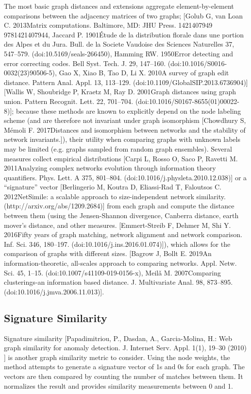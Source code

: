 The most basic graph distances and extensions aggregate element-by-element comparisons between the adjacency matrices of two graphs; [Golub G, van Loan C. 2013Matrix computations. Baltimore, MD: JHU Press. 1421407949 9781421407944,  Jaccard P. 1901Étude de la distribution florale dans une portion des Alpes et du Jura. Bull. de la Societe Vaudoise des Sciences Naturelles 37, 547–579. (doi:10.5169/seals-266450),  Hamming RW. 1950Error detecting and error correcting codes. Bell Syst. Tech. J. 29, 147–160. (doi:10.1016/S0016-0032(23)90506-5),  Gao X, Xiao B, Tao D, Li X. 2010A survey of graph edit distance. Pattern Anal. Appl. 13, 113–129. (doi:10.1109/GlobalSIP.2013.6736904)][Wallis W, Shoubridge P, Kraetz M, Ray D. 2001Graph distances using graph union. Pattern Recognit. Lett. 22, 701–704. (doi:10.1016/S0167-8655(01)00022-8)]; because these methods are known to explicitly depend on the node labeling scheme (and are therefore not invariant under graph isomorphism [Chowdhury S, Mémoli F. 2017Distances and isomorphism between networks and the stability of network invariants.]), their utility when comparing graphs with unknown labels  may be limited (e.g. graphs sampled from random graph ensembles). Several measures collect empirical distributions [Carpi L, Rosso O, Saco P, Ravetti M. 2011Analyzing complex networks evolution through information theory quantifiers. Phys. Lett. A 375, 801–804. (doi:10.1016/j.physleta.2010.12.038)] or a “signature” vector [Berlingerio M, Koutra D, Eliassi-Rad T, Faloutsos C. 2012NetSimile: a scalable approach to size-independent network similarity. (http://arxiv.org/abs/1209.2684)] from each graph and compute the distance between them (using the Jensen-Shannon divergence, Canberra distance, earth mover’s distance, and other measures. [Emmert-Streib F, Dehmer M, Shi Y. 2016Fifty years of graph matching, network alignment and network comparison. Inf. Sci. 346, 180–197. (doi:10.1016/j.ins.2016.01.074)]), which allows for the comparison of graphs with different sizes. [Bagrow J, Bollt E. 2019An information-theoretic, all-scales approach to comparing networks. Appl. Netw. Sci. 45, 1–15. (doi:10.1007/s41109-019-0156-x), Meilǎ M. 2007Comparing clusterings-an information based distance. J. Multivariate Anal. 98, 873–895. (doi:10.1016/j.jmva.2006.11.013)].

\subsection{Signature Similarity}
Signature similarity [Papadimitriou, P., Dasdan, A., Garcia-Molina, H.: Web graph similarity for anomaly detection. J. Internet Serv. Appl. 1(1), 19–30 (2010) ] is another graph similarity metric to consider. Using the node weights, the method attempts to generate a signature vector of 1s and 0s for each graph. The vectors are then compared by counting the number of matches between them. It normalizes the result and provides similarity measurements between 0 and 1.


